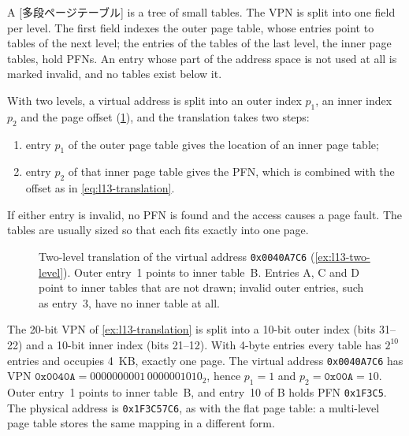 \documentclass[../main.tex]{subfiles}
\begin{document}
\begin{definition}
  A [多段ページテーブル] is a tree of small
  tables.  The VPN is split into one field per level.  The first field indexes
  the outer page table, whose entries point to tables of the next level; the
  entries of the tables of the last level, the inner page tables, hold PFNs.  An
  entry whose part of the address space is not used at all is marked invalid,
  and no tables exist below it.
\end{definition}

With two levels, a virtual address is split into an outer index $p_1$, an
inner index $p_2$ and the page offset (\cref{fig:l13-two-level}), and the
translation takes two steps:
\begin{enumerate}
  \item entry $p_1$ of the outer page table gives the location of an inner
    page table;
  \item entry $p_2$ of that inner page table gives the PFN, which is combined
    with the offset as in \cref{eq:l13-translation}.
\end{enumerate}
If either entry is invalid, no PFN is found and the access causes a page
fault.  The tables are usually sized so that each fits exactly into one
page.

\begin{figure}[htbp]
  \centering
  
  \caption{Two-level translation of the virtual address \texttt{0x0040A7C6}
    (\cref{ex:l13-two-level}).  Outer entry~1 points to inner table~B.  Entries
    A, C and D point to inner tables that are not drawn; invalid outer entries,
    such as entry~3, have no inner table at all.}
  \label{fig:l13-two-level}
\end{figure}

\begin{example}
  \label{ex:l13-two-level}
  The 20-bit VPN of \cref{ex:l13-translation} is split into a 10-bit outer
  index (bits 31--22) and a 10-bit inner index (bits 21--12).  With 4-byte
  entries every table has $2^{10}$ entries and occupies 4~KB, exactly one page.  The
  virtual address \texttt{0x0040A7C6} has VPN
  $\texttt{0x0040A} = 0000000001\,0000001010_2$, hence $p_1 = 1$ and
  $p_2 = \texttt{0x00A} = 10$.  Outer entry~1 points to inner table~B, and
  entry~10 of B holds PFN \texttt{0x1F3C5}.  The physical address is
  \texttt{0x1F3C57C6}, as with the flat page table: a multi-level page table
  stores the same mapping in a different form.
\end{example}
\end{document}
